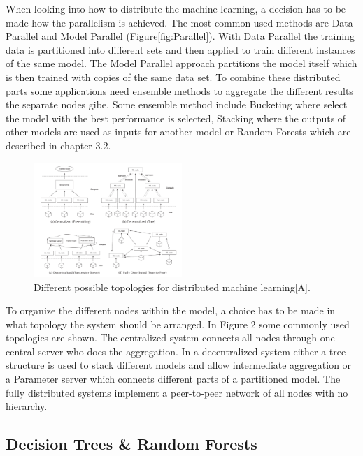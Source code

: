 When looking into how to distribute the machine learning, a decision has to be made how the parallelism is achieved. The most common used methods are Data Parallel and Model Parallel (Figure\ref{fig:Parallel}). With Data Parallel the training data is partitioned into different sets and then applied to train different instances of the same model. The Model Parallel approach partitions the model itself which is then trained with copies of the same data set. To combine these distributed parts some applications need ensemble methods to aggregate the different results the separate nodes gibe. Some ensemble method include Bucketing where select the model with the best performance is selected, Stacking where the outputs of other models are used as inputs for another model or Random Forests which are described in chapter 3.2. \\  
\begin{figure}
	\centering
	\includegraphics[width=0.5\textwidth]{topologies.PNG}
	\caption{Different possible topologies for distributed machine learning[A].}
	\label{fig:Topo}
\end{figure}


To organize the different nodes within the model, a choice has to be made in what topology the system should be arranged. In Figure 2 some commonly used topologies are shown.  The centralized system connects all nodes through one central server who does the aggregation. In a decentralized system either a tree structure is used to stack different models and allow intermediate aggregation or a Parameter server which connects different parts of a partitioned model. The fully distributed systems implement a peer-to-peer network of all nodes with no hierarchy. 



\subsection{Decision Trees \& Random Forests}

